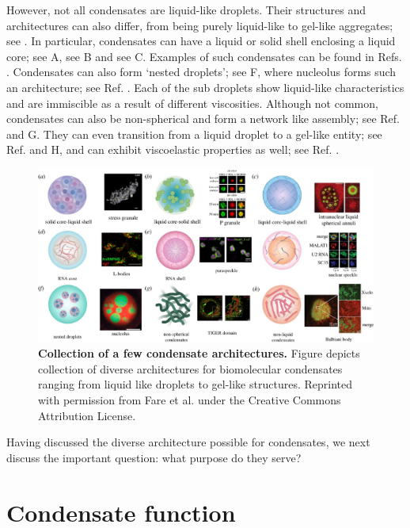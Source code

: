However, not all condensates are liquid-like droplets.
Their structures and architectures can also differ, from being purely liquid-like to gel-like aggregates; see .
In particular, condensates can have a liquid or solid shell enclosing a liquid core; see A, see B and see C.
Examples of such condensates can be found in Refs. \cite{JAIN2016487,Putnam2019}.
Condensates can also form `nested droplets'; see F, where nucleolus forms such an architecture; see Ref. \cite{Feric2013}.
Each of the sub droplets show liquid-like characteristics and are immiscible as a result of different viscosities. 
Although not common, condensates can also be non-spherical and form a network like assembly; see Ref. \cite{MA20181492} and G.
They can even transition from a liquid droplet to a gel-like entity; see Ref. \cite{BOKE2016637} and H, and can exhibit viscoelastic properties as well; see Ref. \cite{Jawerth2018}.
\begin{figure}[tb]
\centering
\includegraphics[scale=0.53]{MainContent/BioFigures/architecture.pdf}
\caption{\textbf{Collection of a few condensate architectures.}
Figure depicts collection of diverse architectures for biomolecular condensates ranging from liquid like droplets to gel-like structures. 
Reprinted with permission from Fare et al. \cite{Fare2021} under the Creative Commons Attribution License.
}
\label{fig:architecture}
\end{figure}
Having discussed the diverse architecture possible for condensates, we next discuss the important question: what purpose do they serve?

\section{Condensate function}

